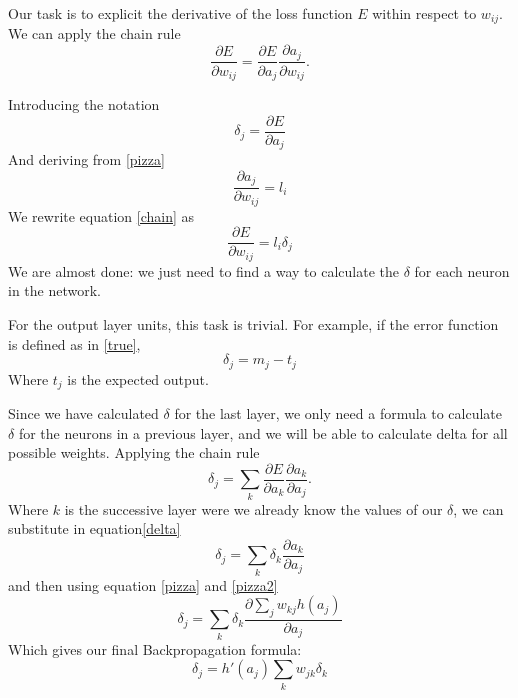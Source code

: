 \documentclass[a4paper]{report}
\begin{document}
Our task is to explicit the derivative of the loss function $E$ within respect to $w_{ij}$. We can apply the chain rule
\begin{equation}
\frac{\partial E}{\partial w_{ij}}=\frac{\partial E}{\partial a_j} \frac{\partial a_j}{\partial w_{ij}}.
\label{chain}
\end{equation}

Introducing the notation
\begin{equation}
    \delta_j = \frac{\partial E}{\partial a_j}
    \label{delta}
\end{equation}
And deriving from \ref{pizza}
\begin{equation}
\frac{\partial a_j}{\partial w_{ij}} = l_i
\end{equation}
We rewrite equation \ref{chain} as
\begin{equation}
\frac{\partial E}{\partial w_{ij}}= l_i \delta_j
\end{equation}
We are almost done: we just need to find a way to calculate the $\delta$ for each neuron in the network.

For the output layer units, this task is trivial. For example, if the error function is defined as in \ref{true},
\begin{equation}
\delta_j = m_j - t_j 
\end{equation}
Where $t_j$ is the expected output.

Since we have calculated $\delta$ for the last layer, we only need a formula to calculate $\delta$ for the neurons in a previous layer, and we will be able to calculate delta for all possible weights. Applying the chain rule
\begin{equation}
\delta_j = \sum_k \frac{\partial E}{\partial a_k} \frac{\partial a_k}{\partial a_j}.
\end{equation}
Where $k$ is the successive layer were we already know the values of our $\delta$, we can substitute in equation\ref{delta}
\begin{equation}
\delta_j = \sum_k\delta_k \frac{\partial a_k}{\partial a_j}
\end{equation}
and then using equation \ref{pizza} and \ref{pizza2}
\begin{equation}
\delta_j = \sum_k \delta_k \frac{\partial \sum_j w_{kj} h(a_j)}{\partial a_j}
\end{equation}
Which gives our final Backpropagation formula:
\begin{equation}
\delta_j = h'(a_j)\sum_k w_{jk}\delta_k
\end{equation}
\end{document}
